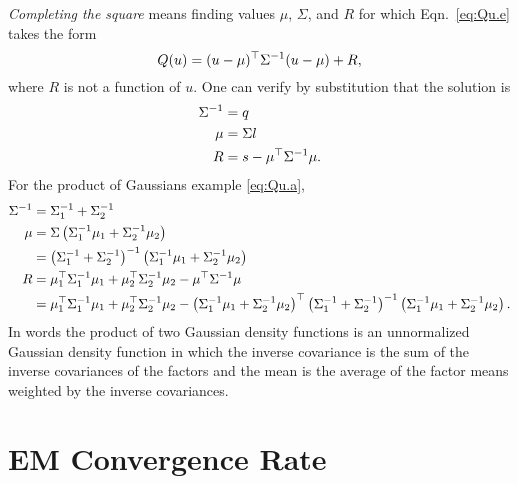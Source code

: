 \emph{Completing the square} means finding values $\mu$, $\Sigma$, and
$R$ for which Eqn.~\eqref{eq:Qu.e} takes the form
\begin{equation*}
  Q(u) = (u - \mu)^\top \Sigma^{-1} (u - \mu) + R,
\end{equation*}
where $R$ is not a function of $u$.  One can verify by substitution
that the solution is
\begin{align*}
  \Sigma^{-1} &= q\\
  \mu &= \Sigma l\\
  R &= s -  \mu^\top \Sigma^{-1} \mu.
\end{align*}
For the product of Gaussians example \eqref{eq:Qu.a},
\begin{subequations}
  \label{eq:GaussianProduct}
  \begin{align}
  \Sigma^{-1} &= \Sigma_1^{-1} + \Sigma_2^{-1} \\
  \mu &= \Sigma \left( \Sigma_1^{-1} \mu_1 + \Sigma_2^{-1} \mu_2
  \right) \\
  &= \left( \Sigma_1^{-1} + \Sigma_2^{-1} \right)^{-1} \left(
  \Sigma_1^{-1} \mu_1 + \Sigma_2^{-1} \mu_2  \right) \\
  R &= \mu_1^\top \Sigma_1^{-1} \mu_1 + \mu_2^\top
  \Sigma_2^{-1} \mu_2 -  \mu^\top \Sigma^{-1} \mu \\
  &= \mu_1^\top \Sigma_1^{-1} \mu_1 + \mu_2^\top
  \Sigma_2^{-1} \mu_2 - \left( \Sigma_1^{-1} \mu_1 + \Sigma_2^{-1}
  \mu_2  \right) ^\top \left( \Sigma_1^{-1} + \Sigma_2^{-1}
  \right)^{-1} \left( \Sigma_1^{-1} \mu_1 + \Sigma_2^{-1} \mu_2
  \right).
\end{align}
\end{subequations}
In words the product of two Gaussian density functions is an
unnormalized Gaussian density function in which the inverse covariance
is the sum of the inverse covariances of the factors and the mean is
the average of the factor means weighted by the inverse covariances.

\chapter{EM Convergence Rate}
\label{chap:em_appendix}


